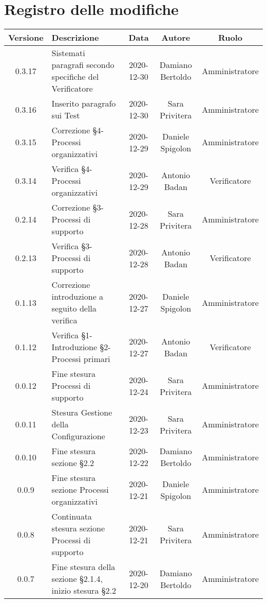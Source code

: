 \section*{Registro delle modifiche}

\begin{center}
	\begin{longtable}{|c|p{5cm}|c|c|c|}
	\hline
	\rowcolor{lighter-grayer}
	\textbf{Versione} & \textbf{Descrizione} & \textbf{Data} & \textbf{Autore} & \textbf{Ruolo} \\
	\hline
	\endfirsthead

	0.3.17 & Sistemati paragrafi secondo specifiche del Verificatore  & 2020-12-30 & Damiano Bertoldo & Amministratore \\
	\hline
	0.3.16 & Inserito paragrafo sui Test  & 2020-12-30 & Sara Privitera & Amministratore \\
	\hline
	0.3.15 & Correzione §4-Processi organizzativi  & 2020-12-29 & Daniele Spigolon & Amministratore \\
	\hline
	0.3.14 & Verifica §4-Processi organizzativi  & 2020-12-29 & Antonio Badan & Verificatore \\
	\hline
	0.2.14 & Correzione §3-Processi di supporto  & 2020-12-28 & Sara Privitera & Amministratore \\
	\hline
	0.2.13 & Verifica §3-Processi di supporto  & 2020-12-28 & Antonio Badan & Verificatore \\
	\hline
	0.1.13 & Correzione introduzione a seguito della verifica  & 2020-12-27 & Daniele Spigolon & Amministratore \\
	\hline
	0.1.12 & Verifica §1-Introduzione §2-Processi primari  & 2020-12-27 & Antonio Badan & Verificatore \\
	\hline
	0.0.12 & Fine stesura Processi di supporto & 2020-12-24 & Sara Privitera & Amministratore \\
	\hline
	0.0.11 & Stesura Gestione della Configurazione & 2020-12-23 & Sara Privitera & Amministratore \\
	\hline
	0.0.10 & Fine stesura sezione §2.2 & 2020-12-22 & Damiano Bertoldo & Amministratore \\
	\hline
	0.0.9 & Fine stesura sezione Processi organizzativi & 2020-12-21 & Daniele Spigolon & Amministratore \\
	\hline
	0.0.8 & Continuata stesura sezione Processi di supporto & 2020-12-21 & Sara Privitera & Amministratore \\
	\hline
	0.0.7 & Fine stesura della sezione §2.1.4, inizio stesura §2.2 & 2020-12-20 & Damiano Bertoldo & Amministratore \\

\end{longtable}
\end{center}
